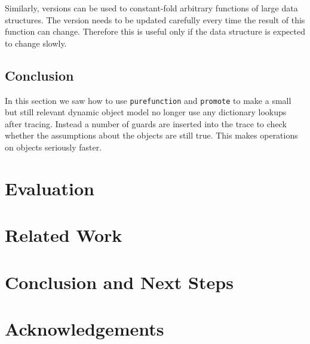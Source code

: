 \documentclass{sig-alternate}
\begin{document}
Similarly, versions can be used to constant-fold arbitrary functions of large data
structures. The version needs to be updated carefully every time the result of
this function can change. Therefore this is useful only if the data structure is
expected to change slowly.



\subsection{Conclusion}

In this section we saw how to use \texttt{purefunction} and \texttt{promote} to make a
small but still relevant dynamic object model no longer use any dictionary lookups
after tracing. Instead a number of guards are inserted into the
trace to check whether the assumptions about the objects are still true. This
makes operations on objects seriously faster.

\section{Evaluation}
\label{sect:evaluation}

\section{Related Work}

\section{Conclusion and Next Steps}

\section*{Acknowledgements}



\end{document}
